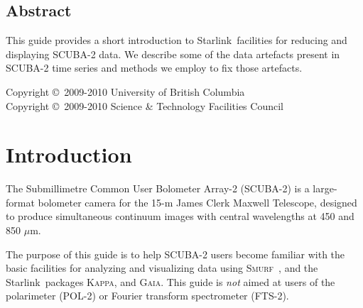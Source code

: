 \documentclass[twoside,11pt]{article}
\newcommand{\micron}{\mbox{\,${\mu}$m}}            %
\newcommand{\stardocinitials}  {SC}
\newcommand{\stardoccopyright}
{Copyright \copyright\ 2009-2010 University of British Columbia \\
 Copyright \copyright\ 2009-2010 Science \& Technology Facilities Council}
\newcommand{\stardocnumber}    {19.3}
\newcommand{\stardocabstract}  {

  This guide provides a short introduction to \starlink\ facilities
  for reducing and displaying SCUBA-2 data. We describe
  some of the data artefacts present in SCUBA-2 time series and
  methods we employ to fix those artefacts.
}
\newcommand{\stardocname}{\stardocinitials /\stardocnumber}
\newcommand{\htmladdnormallink}[2]{#1}
\newenvironment{latexonly}{}{}
\newcommand{\xref}[3]{#1}
\newcommand{\xlabel}[1]{}
\renewcommand{\_}{\texttt{\symbol{95}}}
\newcommand{\starlink}{\htmladdnormallink{Starlink}{http://starlink.jach.hawaii.edu}}
\newcommand{\Kappa}{\xref{\textsc{Kappa}}{sun95}{}}
\newcommand{\gaia}{\xref{\textsc{Gaia}}{sun214}{}}
\newcommand{\smurf}{\xref{\textsc{Smurf}}{sun258}{}}
\renewcommand{\thepage}{\roman{page}}
\begin{document}
\begin{htmlonly}
  \section{\xlabel{abstract}Abstract}
\end{htmlonly}

\stardocabstract

\begin{latexonly}
\newpage
\vspace*{\fill}
\stardoccopyright
\end{latexonly}

  \newpage
  \begin{latexonly}
    \setlength{\parskip}{0mm}
    \tableofcontents
    \setlength{\parskip}{\medskipamount}
    \markboth{\stardocname}{\stardocname}
  \end{latexonly}

\cleardoublepage
\renewcommand{\thepage}{\arabic{page}}
\setcounter{page}{1}

\section{\xlabel{introduction}Introduction}

The Submillimetre Common User Bolometer Array-2 (SCUBA-2) is a
large-format bolometer camera for the 15-m James Clerk Maxwell
Telescope, designed to produce simultaneous continuum images with
central wavelengths at 450 and 850\,\micron.

The purpose of this guide is to help SCUBA-2 users become familiar
with the basic facilities for analyzing and visualizing data using
\smurf\ \cite{smurf}, and the \starlink\ packages \Kappa \cite{kappa},
and \gaia \cite{gaia}.  This guide is {\em not} aimed at users of the
polarimeter (POL-2) or Fourier transform spectrometer (FTS-2).
\end{document}

